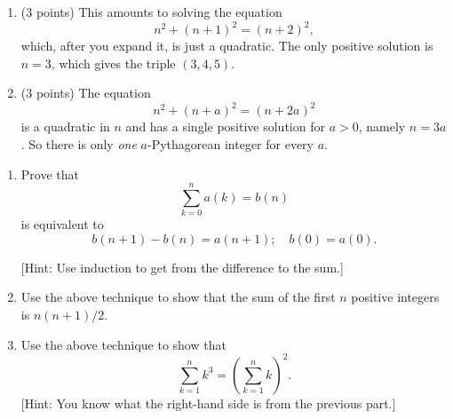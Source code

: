 \documentclass[12pt]{rudin}
\begin{document}
\begin{Answer}
    \begin{enumerate}[label=(\textbf{\alph*})]
	    \item (3 points) This amounts to solving the equation
            \begin{equation*}
                n^2 + (n + 1)^2 = (n + 2)^2,
            \end{equation*}
		    which, after you expand it, is just a quadratic. The only
		    positive solution is $n = 3$, which gives the triple $(3,
		    4, 5)$.

	    \item (3 points) The equation
            \begin{equation*}
                n^2 + (n + a)^2 = (n + 2a)^2
            \end{equation*}
	    is a quadratic in $n$ and has a single positive solution for $a >
		    0$, namely $n = 3a$. So there is only \emph{one}
		    $a$-Pythagorean integer for every $a$.
    \end{enumerate}
\end{Answer}

\begin{Exercise}
    \begin{enumerate}[label=(\textbf{\alph*})]
        \item Prove that
            \begin{equation*}
                \sum_{k = 0}^n a(k) = b(n)
            \end{equation*}
            is equivalent to
            \begin{equation*}
                b(n + 1) - b(n) = a(n + 1); \quad b(0) = a(0).
            \end{equation*}

            [Hint: Use induction to get from the difference to the sum.]

        \item Use the above technique to show that the sum of the first $n$
            positive integers is $n(n + 1) / 2$.

        \item Use the above technique to show that
            \begin{equation*}
                \sum_{k = 1}^n k^3 = \left( \sum_{k = 1}^n k \right)^2.
            \end{equation*}
            [Hint: You know what the right-hand side is from the previous
            part.]
    \end{enumerate}
\end{Exercise}
\end{document}
